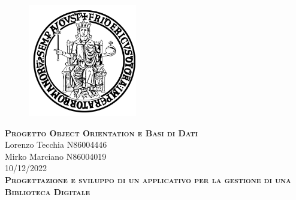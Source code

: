 \documentclass{report}
\begin{document}
\begin{center}
	
\end{center}
    \begin{figure}[htbp!]
        \begin{center}
            \includegraphics[width=.25\textwidth]{Immagini/FedericoII.png}
        \end{center}
    \end{figure}
    

    \begin{center}
        {\scshape\Large\bfseries Progetto Object Orientation e Basi di Dati}
        \\
        Lorenzo Tecchia N86004446 \\ Mirko Marciano N86004019 \\ 10/12/2022 \\
        
        
        
        
        \scshape\Large\bfseries Progettazione e sviluppo di un applicativo per la gestione di una Biblioteca Digitale
        
    \end{center}


    \newpage
    
    \tableofcontents
    \listoffigures
    \listoftables
    
    
    
    
    
    
    
\end{document}
